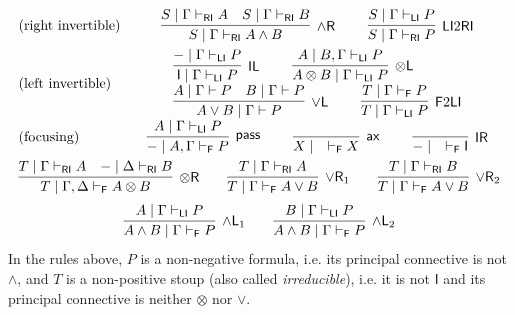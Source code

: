 \documentclass[submission,copyright,creativecommons]{eptcs}
\theoremstyle{definition}
\newcommand{\tl}{\otimes \mathsf{L}}
\newcommand{\tr}{\otimes \mathsf{R}}
\newcommand{\pass}{\mathsf{pass}}
\newcommand{\unitl}{\mathsf{IL}}
\newcommand{\unitr}{\mathsf{IR}}
\newcommand{\andlone}{\land \mathsf{L}_{1}}
\newcommand{\andltwo}{\land \mathsf{L}_{2}}
\newcommand{\andr}{\land \mathsf{R}}
\newcommand{\orl}{\lor \mathsf{L}}
\newcommand{\orrone}{\lor \mathsf{R}_{1}}
\newcommand{\orrtwo}{\lor \mathsf{R}_{2}}
\newcommand{\ax}{\mathsf{ax}}
\newcommand{\ot}{\otimes}
\newcommand{\I}{\mathsf{I}}
\newcommand{\RI}{\mathsf{RI}}
\newcommand{\LI}{\mathsf{LI}}
\newcommand{\F}{\mathsf{F}}
\newcommand{\proofbox}[1]{\begin{tabular}{l} #1 \end{tabular}}
\newcommand\niccolo[1]{\mbox{}
{\marginpar{\color{red}NV}}
{\sf\noindent\color{red}#1}}%
\begin{document}
\begin{equation}\label{eq:naive:focus}
  \begin{array}{lc}
    \text{(right invertible)} & %
    \proofbox{
      \infer[\andr]{S \mid \Gamma \vdash_{\RI} A \land B}{
        S \mid \Gamma \vdash_{\RI} A
        &
        S \mid \Gamma \vdash_{\RI} B
      }
    \qquad
    \infer[\LI 2 \RI]{S \mid \Gamma \vdash_{\RI} P}{S \mid \Gamma \vdash_{\LI} P}
    }
    \\[10pt]
    \text{(left invertible)} & %
    \proofbox{
      \infer[\unitl]{\I \mid \Gamma \vdash_{\LI} P}{{-} \mid \Gamma \vdash_{\LI} P}
    \qquad
    \infer[\tl]{A \ot B \mid \Gamma \vdash_{\LI} P}{A \mid B , \Gamma \vdash_{\LI} P}
    \\
    \infer[\orl]{A \lor B \mid \Gamma \vdash P}{
      A \mid \Gamma \vdash P
      &
      B \mid \Gamma \vdash P
    }
    \qquad
    \infer[\F 2 \LI]{T \mid \Gamma \vdash_{\LI} P}{T \mid \Gamma \vdash_{\F} P}
    }
    \\[10pt]
    \text{(focusing)} &    %
    \proofbox{
    \infer[\pass]{{-} \mid A , \Gamma \vdash_{\F} P }{
        A \mid \Gamma \vdash_{\LI} P
    }
    \qquad
    \infer[\ax]{X \mid \quad \vdash_{\F} X}{}
    \qquad
    \infer[\unitr]{{-} \mid \quad \vdash_{\F} \I}{}
    }
    \\[10pt]
    \multicolumn{2}{c}{
    \infer[\tr]{T \mid \Gamma , \Delta \vdash_{\F} A \ot B}{
      T \mid \Gamma \vdash_{\RI} A
      &
      {-} \mid \Delta \vdash_{\RI} B
    }
    \qquad
    \infer[\orrone]{T \mid \Gamma \vdash_{\F} A \lor B}{
      T \mid \Gamma \vdash_{\RI} A
    }
    \qquad
    \infer[\orrtwo]{T \mid \Gamma \vdash_{\F} A \lor B}{
      T \mid \Gamma \vdash_{\RI} B
    }
    }
    \\[6pt]
    \multicolumn{2}{c}{
    \infer[\andlone]{A \land B \mid \Gamma \vdash_{\F} P}{A \mid \Gamma \vdash_{\LI} P}
    \qquad
    \infer[\andltwo]{A \land B \mid \Gamma \vdash_{\F} P}{B \mid \Gamma \vdash_{\LI} P}
    }
  \end{array}
\end{equation}
In the rules above, $P$ is a non-negative formula, i.e. its principal connective is not $\land$, and $T$ is a non-positive stoup (also called \emph{irreducible}), i.e. it is not $\I$ and its principal connective is neither $\ot$ nor $\lor$.
\end{document}
